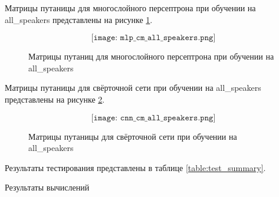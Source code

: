 Матрицы путаницы для многослойного персептрона при обучении на all\_speakers представлены на рисунке \ref{fig:mlp_cm_all_speakers}.

\begin{figure}[H]
	\[\texttt{[image: mlp\_cm\_all\_speakers.png]}\]
	\caption{Матрицы путаниц для многослойного персептрона при обучении на all\_speakers}
	\label{fig:mlp_cm_all_speakers}
\end{figure}


Матрицы путаницы для свёрточной сети при обучении на all\_speakers представлены на рисунке \ref{fig:cnn_cm_all_speakers}.

\begin{figure}[H]
	\[\texttt{[image: cnn\_cm\_all\_speakers.png]}\]
	\caption{Матрицы путаницы для свёрточной сети при обучении на all\_speakers}
	\label{fig:cnn_cm_all_speakers}
\end{figure}

Результаты тестирования представлены в таблице \ref{table:test_summary}. 

\begin{table}[H]
\small
\centering
{}
\caption{Результаты вычислений}
\label{table:test_summary}
\end{table}